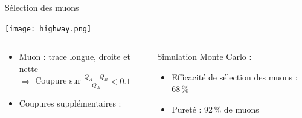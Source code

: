     \begin{frame}{Sélection des muons}
        \begin{scriptsize}
        \texttt{[image: highway.png]}
        \begin{columns}
            \begin{column}{0.5\textwidth}
                \begin{itemize}
                    \item Muon : trace longue, droite et nette \\ $\Rightarrow$ Coupure sur $\frac{Q_A-Q_B}{Q_A} < 0.1$
                    \item Coupures supplémentaires : \begin{itemize}\end{itemize}
                \end{itemize}
            \end{column}
            \begin{column}{0.5\textwidth}
                \hspace{0.3cm} Simulation Monte Carlo :
                \begin{itemize}
                    \item Efficacité de sélection des muons : 68\,\%
                    \item Pureté : 92\,\% de muons
                \end{itemize}
            \end{column}
        \end{columns}
        \end{scriptsize}
    \end{frame}
    
